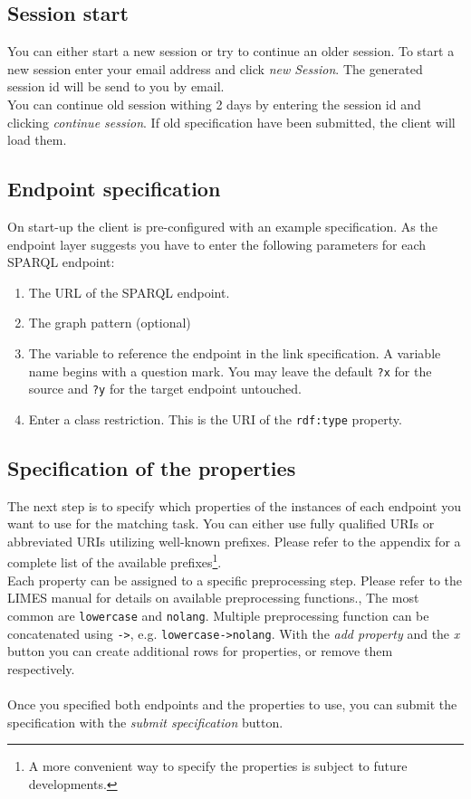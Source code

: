 \documentclass{article}
\begin{document}
\subsection{Session start}
You can either start a new session or try to continue an older session. To start a new session enter your email address and click \textit{new Session}. The generated session id will be send to you by email.\\ You can continue old session withing 2 days by entering the session id and clicking \textit{continue session}. If old specification have been submitted, the client will load them.
\subsection{Endpoint specification}
On start-up the client is pre-configured with an example specification. As the endpoint layer suggests you have to enter the following parameters for each SPARQL endpoint:

\begin{enumerate}
	\item The URL of the SPARQL endpoint.
	\item The graph pattern (optional)
	\item The variable to reference the endpoint in the link specification. A variable name begins with a question mark. You may leave the default \texttt{?x} for the source and \texttt{?y} for the target endpoint untouched.
	\item Enter a class restriction. This is the URI of the \texttt{rdf:type} property.
\end{enumerate}

\subsection{Specification of the properties}
The next step is to specify which properties of the instances of each endpoint you want to use for the matching task. You can either use fully qualified URIs or abbreviated URIs utilizing well-known prefixes. Please refer to the appendix for a complete list of the available prefixes\footnote{A more convenient way to specify the properties is subject to future developments.}.\\Each property can be assigned to a specific preprocessing step. Please refer to the LIMES manual for details on available preprocessing functions., The most common are \texttt{lowercase} and \texttt{nolang}. Multiple preprocessing function can be concatenated using \texttt{->}, e.g. \texttt{lowercase->nolang}. With the \textit{add property} and the \textit{x} button you can create additional rows for properties, or remove them respectively.\\ \\
Once you specified both endpoints and the properties to use, you can submit the specification with the \textit{submit specification}  button.
\end{document}

